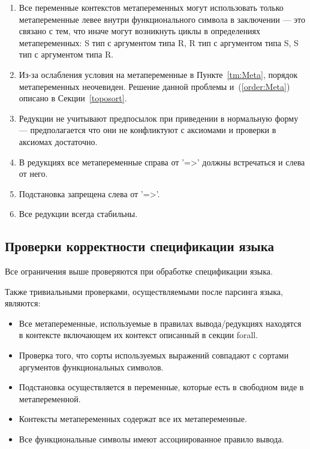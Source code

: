 \begin{enumerate}
\item \label{order:Meta} Все переменные контекстов метапеременных могут использовать только метапеременные левее внутри функционального символа в заключении --- это связано с тем, что иначе могут возникнуть циклы в определениях метапеременных: S тип с аргументом типа R, R тип с аргументом типа S, S тип с аргументом типа R.

\item Из-за ослабления условия на метапеременные в Пункте~\ref{tm:Meta}, порядок метапеременных неочевиден. Решение данной проблемы и~(\ref{order:Meta}) описано в Секции~\ref{toposort}.

\item Редукции не учитывают предпосылок при приведении в нормальную форму --- предполагается что они не конфликтуют с аксиомами и проверки в аксиомах достаточно.

\item В редукциях все метапеременные справа от '=>' должны встречаться и слева от него.

\item Подстановка запрещена слева от '=>'.

\item Все редукции всегда стабильны.

\end{enumerate}

\subsection{Проверки корректности спецификации языка}

Все ограничения выше проверяются при обработке спецификации языка.

Также тривиальными проверками, осуществляемыми после парсинга языка, являются:
\begin{itemize}
\item Все метапеременные, используемые в правилах вывода/редукциях находятся в контексте включающем их контекст описанный в секции forall.
\item Проверка того, что сорты используемых выражений совпадают с сортами аргументов функциональных символов.
\item Подстановка осуществляется в переменные, которые есть в свободном виде в метапеременной.
\item Контексты метапеременных содержат все их метапеременные.
\item Все функциональные символы имеют ассоциированное правило вывода.
\end{itemize}
